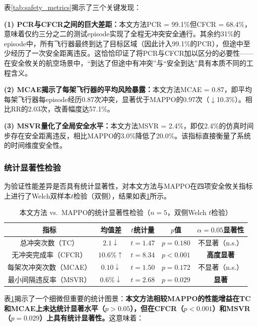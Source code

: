 \documentclass[12pt,a4paper,UTF8]{ctexart}
\begin{document}
表\ref{tab:safety_metrics}揭示了三个关键发现：

\textbf{(1) PCR与CFCR之间的巨大差距：}本文方法PCR = 99.1\%但CFCR = 68.4\%，意味着仅约三分之二的测试episode实现了全程无冲突安全通行。其余约31\%的episode中，所有飞行器最终到达了目标区域（因此计入99.1\%的PCR），但途中至少经历了一次安全距离违反。这恰恰印证了将PCR与CFCR加以区分的必要性——在安全攸关的航空场景中，``到达了但途中有冲突''与``安全到达''具有本质不同的工程含义。

\textbf{(2) MCAE揭示了每架飞行器的平均风险暴露：}本文方法MCAE = 0.87，即平均每架飞行器每episode经历0.87次冲突，显著优于MAPPO的0.97次（$\downarrow$10.3\%）。相比RR的2.03次，改善幅度达57.1\%。

\textbf{(3) MSVR量化了全局安全水平：}本文方法MSVR = 2.4\%，即仅2.4\%的仿真时间步存在安全距离违反，相比MAPPO的3.0\%降低了20.0\%。该指标直接衡量了系统的时间维度安全性。

\subsubsection{统计显著性检验}

为验证性能差异是否具有统计显著性，对本文方法与MAPPO在四项安全攸关指标上进行了Welch双样本$t$检验（双侧），结果如表\ref{tab:statistical_tests}所示。

\begin{table}[H]
    \centering
    \caption{本文方法 vs.\ MAPPO的统计显著性检验（$n=5$，双侧Welch $t$检验）}
    \label{tab:statistical_tests}
    \begin{tabular}{|c|c|c|c|c|}
        \hline
        \textbf{指标} & \textbf{均值差} & \textbf{$t$统计量} & \textbf{$p$值} & \textbf{$\alpha=0.05$显著性} \\
        \hline
        总冲突次数（TC） & $2.1 \downarrow$ & $t=1.47$ & $p=0.180$ & 不显著（n.s.） \\
        \hline
        无冲突完成率（CFCR） & $10.6\% \uparrow$ & $t=8.34$ & $p<0.001$ & \textbf{高度显著} \\
        \hline
        每架次冲突次数（MCAE） & $0.10 \downarrow$ & $t=1.50$ & $p=0.172$ & 不显著（n.s.） \\
        \hline
        最小间隔违反率（MSVR） & $0.6\% \downarrow$ & $t=2.68$ & $p=0.029$ & \textbf{显著} \\
        \hline
    \end{tabular}
\end{table}

表\ref{tab:statistical_tests}揭示了一个细微但重要的统计图景：\textbf{本文方法相较MAPPO的性能增益在TC和MCAE上未达统计显著水平（$p>0.05$），但在CFCR（$p<0.001$）和MSVR（$p=0.029$）上具有统计显著性。}这意味着：
\end{document}
